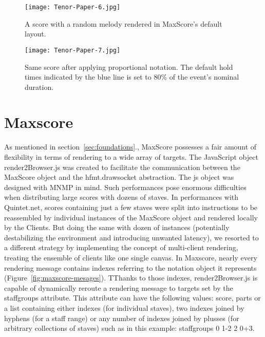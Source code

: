 
\begin{figure*}[h]
    \centering
    \begin{minipage}{0.45\textwidth}
        \centering
        \texttt{[image: Tenor-Paper-6.jpg]} 
                \caption{A score with a random melody rendered in MaxScore’s default layout.
        \label{fig:Tenor-Paper-6}}
    \end{minipage}\hfill
    \begin{minipage}{0.45\textwidth}
        \centering
        \texttt{[image: Tenor-Paper-7.jpg]} 
       	\caption{Same score after applying proportional notation. The default hold times indicated by the blue line is set to 80\% of the event’s nominal duration.
\label{fig:Tenor-Paper-7}}
    \end{minipage}
\end{figure*}

\section{Maxscore}
As mentioned in section~\ref{sec:foundations}., MaxScore possesses a fair amount of flexibility in terms of rendering to a wide array of targets. The JavaScript object render2Browser.js was created to facilitate the communication between the MaxScore object and the hfmt.drawsocket abstraction. The js object was designed with MNMP in mind. Such performances pose enormous difficulties when distributing large scores with dozens of staves. In performances with Quintet.net, scores containing just a few staves were split into instructions to be reassembled by individual instances of the MaxScore object and rendered locally by the Clients. But doing the same with dozen of instances (potentially destabilizing the environment and introducing unwanted latency), we resorted to a different strategy by implementing the concept of multi-client rendering, treating the ensemble of clients like one single canvas. In Maxscore, nearly every rendering message contains indexes referring to the notation object it represents  (Figure~\ref{fig:maxscore-mesages}). TThanks to those indexes, render2Browser.js is capable of dynamically reroute a rendering message to targets set by the staffgroups attribute. This attribute can have the following values: score, parts or a list containing either indexes (for individual staves), two indexes joined by hyphens (for a staff range) or any number of indexes joined by plusses (for arbitrary collections of staves) such as in this example: staffgroups 0 1-2 2 0+3.

